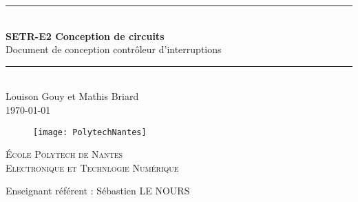 \newcommand{\HRule}{\rule{\linewidth}{0.5mm}} %

\vspace*{1cm}

\begin{center} %
	\HRule \\[0.2cm] %
	\Large
	\textbf{SETR-E2 Conception de circuits}\\ %
	\vspace{1cm}
Document de conception contrôleur d'interruptions \\

	\large
	\HRule \\[1.5cm] %
	\normalsize
	Louison Gouy et Mathis Briard\\
	\today %
\end{center}

\begin{figure}[H] %
	\centering
	\texttt{[image: PolytechNantes]}
\end{figure}

\vspace{2cm}

\begin{center}\large %
	\textsc{École Polytech de Nantes}\\
	\textsc{Electronique et Technlogie Numérique}
\end{center}

\vspace{2cm}

\noindent
Enseignant référent : Sébastien LE NOURS 
\vspace{2cm}